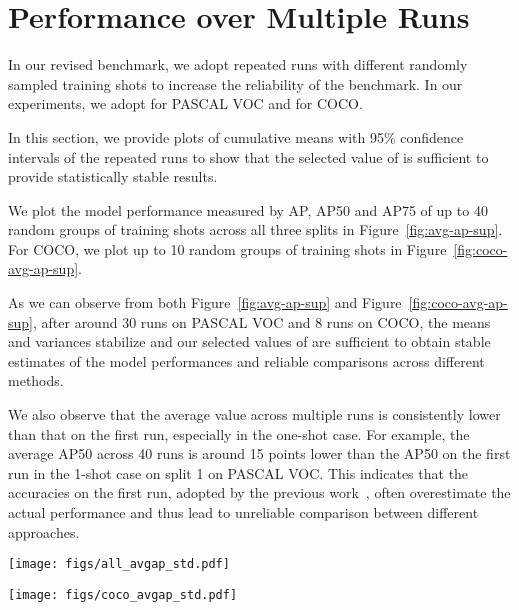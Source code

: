 \documentclass{article}
\begin{document}
\section{Performance over Multiple Runs}
In our revised benchmark, we adopt  repeated runs with different randomly sampled training shots to increase the reliability of the benchmark. In our experiments, we adopt  for PASCAL VOC and  for COCO. 

In this section, we provide plots of cumulative means with 95\% confidence intervals of the repeated runs to show
that the selected value of  is sufficient to provide statistically stable results. 

We plot the model performance measured by AP, AP50 and AP75 of up to 40 random groups of training shots across all three splits in Figure~\ref{fig:avg-ap-sup}. For COCO, we plot  up  to  10  random  groups of training shots in Figure~\ref{fig:coco-avg-ap-sup}.

As we can observe from both Figure~\ref{fig:avg-ap-sup} and Figure~\ref{fig:coco-avg-ap-sup}, after around 30 runs on PASCAL VOC and 8 runs on COCO, the means and variances stabilize and our selected values of  are sufficient to obtain stable estimates of the model performances and reliable comparisons across different methods. 

We also observe that the average value across multiple runs is consistently lower than that on the first run, especially in the one-shot case. For example, the average AP50 across 40 runs is around 15 points lower than the AP50 on the first run in the 1-shot case on split 1 on PASCAL VOC. This indicates that the accuracies on the first run, adopted by the previous work~\cite{kang2019few, yan2019meta, wang2019meta}, often overestimate the actual performance and thus lead to unreliable comparison between different approaches. 


\begin{figure*}[ht]
	\begin{center}
		\centerline{\texttt{[image: figs/all\_avgap\_std.pdf]}}
		\vspace{-5mm}
		\caption{Cumulative means with 95\% confidence intervals across 40 repeated runs, computed on the novel classes of all three splits of PASCAL VOC. The means and variances become stable after around 30 runs.}
		\label{fig:avg-ap-sup}
	\end{center}
	\vspace{-10mm}
\end{figure*}

\begin{figure*}[ht]
	\begin{center}
		\centerline{\texttt{[image: figs/coco\_avgap\_std.pdf]}}
		\vspace{-5mm}
		\caption{Cumulative means with 95\% confidence intervals across 10 repeated runs, computed on the novel classes of COCO.}
		\label{fig:coco-avg-ap-sup}
	\end{center}
	\vspace{-10mm}
\end{figure*}

 
\end{document}
